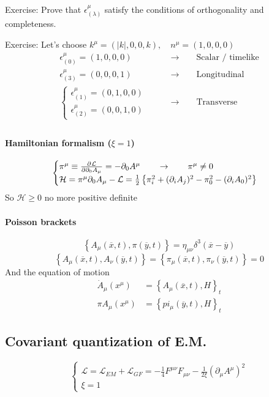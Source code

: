 \begin{example}
Exercise: Prove that $\epsilon^\mu_{(\lambda)}$ satisfy the conditions of orthogonality and completeness.\par
Exercise: Let's choose $k^\mu = (|k|,0,0,k), \quad n^\mu = (1,0,0,0)$
\begin{align*}
\epsilon^\mu_{(0)} = (1,0,0,0) \qquad &\to \qquad \text{Scalar / timelike} \\
\epsilon^\mu_{(3)} = (0,0,0,1) \qquad &\to \qquad \text{Longitudinal} \\
\begin{cases}\epsilon^\mu_{(1)} = (0,1,0,0)\\ \epsilon^\mu_{(2)} = (0,0,1,0)\end{cases} \qquad &\to \qquad \text{Transverse} \\
\end{align*}
\end{example}

\paragraph{Hamiltonian formalism ($\xi=1$)}
\[ \begin{cases}
\pi^\mu \equiv  \frac{\partial{^{}}\mathcal{L}}{\partial{{\partial_0 A_\mu}^{}}}  = - \partial_0 A^\mu \qquad \to \qquad \pi^\mu \neq 0 \\
\mathcal{H} = \pi^\mu\partial_0 A_\mu - \mathcal{L} = \frac{1}{2}\left\{\pi_i^2 + (\partial_iA_j)^2 - \pi_0^2 - (\partial_iA_0)^2\right\}
\end{cases} \]
So $\mathcal{H} \geq 0$  no more positive definite

\paragraph{Poisson brackets}
\[ \left\{A_\mu(\overline{x},t),\pi(\overline{y},t)\right\} = \eta_{\mu\nu}\delta^3(\overline{x}- \overline{y}) \]
\[ \left\{A_\mu(\overline{x},t), A_\nu(\overline{y},t)\right\} = \left\{\pi_\mu(\overline{x},t),\pi_\nu(\overline{y},t)\right\} = 0 \]
And the equation of motion
\begin{align*}
\dot{A}_\mu(x^\mu) &= \left\{A_\mu(\overline{x},t),H\right\}_t \\
\pi{A}_\mu(x^\mu) &= \left\{pi_\mu(\overline{y},t),H\right\}_t
\end{align*}

\subsection{Covariant quantization of E.M.}
\[ \begin{cases}
\mathcal{L} = \mathcal{L}_{EM} + \mathcal{L}_{GF} = - \frac{1}{4}F^{\mu\nu}F_{\mu\nu} - \frac{1}{2\xi}\left(\partial_\mu A^\mu\right)^2\\
\xi = 1
\end{cases} \]
